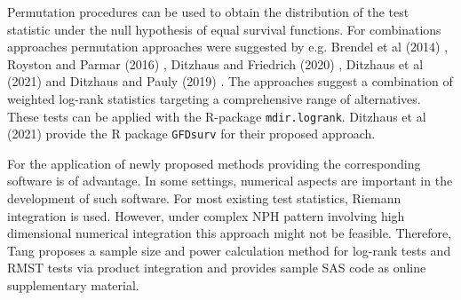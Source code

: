 \noindent Permutation procedures can be used to obtain the distribution of the test statistic under the null hypothesis of equal survival functions. For combinations approaches permutation approaches were suggested by e.g. Brendel et al (2014) \cite{Brendel.2014}, Royston and Parmar (2016) \cite{Royston.2016}, Ditzhaus and Friedrich (2020) \cite{Ditzhaus.2020}, Ditzhaus et al (2021) \cite{Ditzhaus.2021} and Ditzhaus and Pauly (2019) \cite{Ditzhaus.2019}. 
The approaches \cite{Brendel.2014, Ditzhaus.2019, Ditzhaus.2020} suggest a combination of weighted log-rank statistics targeting a comprehensive range of alternatives. These tests can be applied with the R-package \texttt{mdir.logrank}. Ditzhaus et al (2021) \cite{Ditzhaus.2021}  provide the R package \texttt{GFDsurv} for their proposed approach. 

\noindent For the application of newly proposed methods providing the corresponding software is of advantage. In some settings, numerical aspects are important in the development of such software. For most existing test statistics, Riemann integration is used. However, under complex NPH pattern involving high dimensional numerical integration this approach might not be feasible. Therefore, Tang \cite{Tang.2022} proposes a sample size and power calculation method for log-rank tests and RMST tests via product integration and provides sample SAS code as online supplementary material.


